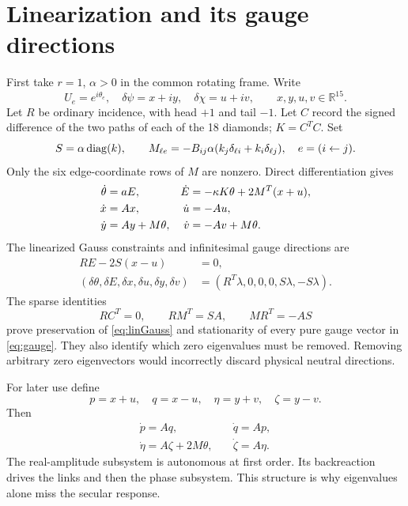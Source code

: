 \documentclass[11pt,a4paper]{article}
\begin{document}
\newpage
\section{Linearization and its gauge directions}
First take $r=1$, $\alpha>0$ in the common rotating frame. Write
\[
U_e=e^{i\theta_e},\quad \delta\psi=x+iy,\quad
\delta\chi=u+iv,\qquad x,y,u,v\in\mathbb R^{15}.
\]
Let $R$ be ordinary incidence, with head $+1$ and tail $-1$. Let $C$ record the signed difference of the two paths of each of the 18 diamonds; $K=C^TC$. Set
\begin{equation}
S=\alpha\operatorname{diag}(k),\qquad
M_{\ell e}=-B_{ij}\alpha(k_j\delta_{\ell i}+k_i\delta_{\ell j}),
\quad e=(i\leftarrow j).
\end{equation}
Only the six edge-coordinate rows of $M$ are nonzero. Direct differentiation gives
\begin{align}
\dot\theta&=aE,&\dot E&=-\kappa K\theta+2M^T(x+u),\notag\\
\dot x&=Ax,&\dot u&=-Au,\label{eq:linear}\\
\dot y&=Ay+M\theta,&\dot v&=-Av+M\theta.\notag
\end{align}
The linearized Gauss constraints and infinitesimal gauge directions are
\begin{align}
RE-2S(x-u)&=0,\label{eq:linGauss}\\
(\delta\theta,\delta E,\delta x,\delta u,\delta y,\delta v)
&=(R^T\lambda,0,0,0,S\lambda,-S\lambda).\label{eq:gauge}
\end{align}
The sparse identities
\begin{equation}
RC^T=0,\qquad RM^T=SA,\qquad MR^T=-AS\label{eq:identities}
\end{equation}
prove preservation of \eqref{eq:linGauss} and stationarity of every pure gauge vector in \eqref{eq:gauge}. They also identify which zero eigenvalues must be removed. Removing arbitrary zero eigenvectors would incorrectly discard physical neutral directions.

For later use define
\[
p=x+u,\quad q=x-u,\quad\eta=y+v,\quad\zeta=y-v.
\]
Then
\begin{align*}
\dot p=Aq,\quad &\dot q=Ap,\\
\dot\eta=A\zeta+2M\theta,\quad &\dot\zeta=A\eta.
\end{align*}
The real-amplitude subsystem is autonomous at first order. Its backreaction drives the links and then the phase subsystem. This structure is why eigenvalues alone miss the secular response.

\newpage
\end{document}
